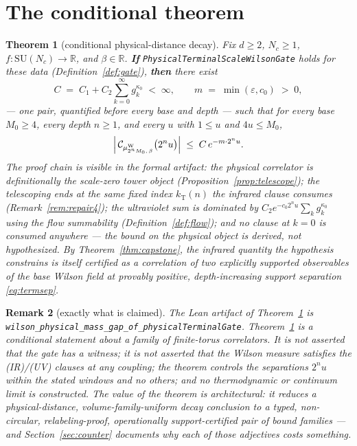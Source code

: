 \documentclass[11pt]{article}
\newtheorem{theorem}{Theorem}[section]
\newtheorem{remark}[theorem]{Remark}
\theoremstyle{definition}
\newcommand{\lean}[1]{\texttt{#1}}
\newcommand{\SU}{\mathrm{SU}}
\newcommand{\Cov}{\mathcal{C}}
\newcommand{\muW}{\mu^{\mathrm{W}}}
\newcommand{\kT}{k_{\mathrm{T}}}
\begin{document}
\section{The conditional theorem}\label{sec:main}

\begin{theorem}[conditional physical-distance decay]
\label{thm:main}
Fix $d \ge 2$, $N_c \ge 1$, $f : \SU(N_c) \to \mathbb{R}$, and
$\beta \in \mathbb{R}$.  \textbf{If}
\lean{PhysicalTerminalScaleWilsonGate} holds for these data
(Definition~\ref{def:gate}), \textbf{then} there exist
\[
C \;=\; C_1 + C_2 \sum_{k=0}^{\infty} g_k^{\kappa_0} \;<\; \infty,
\qquad
m \;=\; \min(\varepsilon, c_0) \;>\; 0,
\]
--- \emph{one pair, quantified before every base and depth} --- such
that for every base $M_0 \ge 4$, every depth $n \ge 1$, and every $u$
with $1 \le u$ and $4u \le M_0$,
\[
\Bigl|\, \Cov_{\muW_{2^n M_0,\, \beta}}\bigl(2^n u\bigr) \Bigr|
 \;\le\; C\, e^{-m \cdot 2^n u} .
\]
The proof chain is visible in the formal artifact: the physical
correlator is definitionally the scale-zero tower object
(Proposition~\ref{prop:telescope}); the telescoping ends at the same
fixed index $\kT(n)$ the infrared clause consumes
(Remark~\ref{rem:repair4}); the ultraviolet sum is dominated by
$C_2 e^{-c_0 2^n u} \sum_k g_k^{\kappa_0}$ using the flow summability
(Definition~\ref{def:flow}); and no clause at $k = 0$ is consumed
anywhere --- the bound on the physical object is derived, not
hypothesized.  By Theorem~\ref{thm:capstone}, the infrared quantity
the hypothesis constrains is itself certified as a correlation of two
explicitly supported observables of the base Wilson field at provably
positive, depth-increasing support separation \eqref{eq:termsep}.
\end{theorem}

\begin{remark}[exactly what is claimed]\label{rem:claims}
The Lean artifact of Theorem~\ref{thm:main} is
\lean{wilson\_physical\_mass\_gap\_of\_physicalTerminalGate}.
Theorem~\ref{thm:main} is a conditional statement about a family of
finite-torus correlators.  It is \emph{not} asserted that the gate has
a witness; it is \emph{not} asserted that the Wilson measure satisfies
the (IR)/(UV) clauses at any coupling; the theorem controls the
separations $2^n u$ within the stated windows and no others; and no
thermodynamic or continuum limit is constructed.  The value of the
theorem is architectural: it reduces a physical-distance,
volume-family-uniform decay conclusion to a typed, non-circular,
relabeling-proof, operationally support-certified pair of bound
families --- and Section~\ref{sec:counter} documents why each of those
adjectives costs something.
\end{remark}
\end{document}
